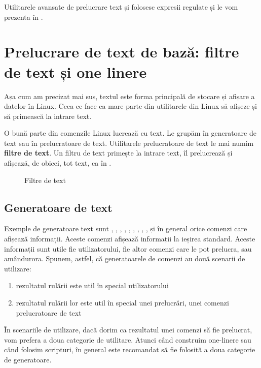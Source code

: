 Utilitarele avansate de prelucrare text  și  folosesc expresii regulate și
le vom prezenta în .

\section{Prelucrare de text de bază: filtre de text și one linere}
\label{sec:cli:basic-proc}

Așa cum am precizat mai sus, textul este forma principală de stocare și afișare
a datelor în Linux. Ceea ce face ca mare parte din utilitarele din Linux să
afișeze și să primească la intrare text.

O bună parte din comenzile Linux lucrează cu text. Le grupăm în generatoare de
text sau în prelucratoare de text. Utilitarele prelucratoare de text le mai
numim \textbf{filtre de text}. Un filtru de text primește la intrare text, îl prelucrează
și afișează, de obicei, tot text, ca în .

\begin{figure}[htbp]
  \centering
  \def\svgwidth{0.8\columnwidth}
  
  \caption{Filtre de text}
  \label{fig:cli:text-filters}
\end{figure}

\subsection{Generatoare de text}
\label{sec:cli:basic-proc:gen}

Exemple de generatoare text sunt , , , , , , , , ,  și în general orice comenzi care afișează informații. Aceste comenzi afișează informații la ieșirea standard. Aceste informații sunt utile fie utilizatorului, fie altor comenzi care le pot prelucra, sau amândurora. Spunem, astfel, că generatoarele de comenzi au două scenarii de utilizare:

\begin{enumerate}
  \item rezultatul rulării este util în special utilizatorului
  \item rezultatul rulării lor este util în special unei prelucrări, unei comenzi prelucratoare de text
\end{enumerate}

În scenariile de utilizare, dacă dorim ca rezultatul unei comenzi să fie prelucrat, vom prefera a
doua categorie de utilitare. Atunci când construim one-linere sau când folosim
scripturi, în general este recomandat să fie folosită a doua categorie de
generatoare.

